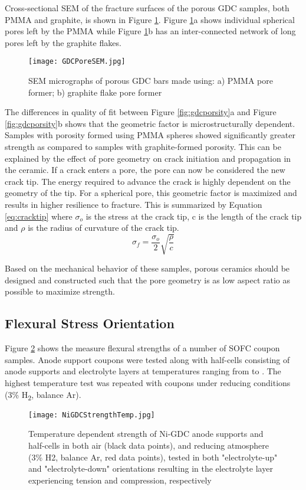 Cross-sectional SEM of the fracture surfaces of the porous GDC samples,
both PMMA and graphite, is shown in Figure \ref{fig:GDCPoreSEM}.
Figure \ref{fig:GDCPoreSEM}a shows individual spherical pores left by the PMMA while Figure \ref{fig:GDCPoreSEM}b has an inter-connected network of long pores left by the graphite flakes.
\begin{figure}
    \texttt{[image: GDCPoreSEM.jpg]}
    \caption{SEM micrographs of porous GDC bars made using: a) PMMA pore former; b) graphite flake pore former}
    \label{fig:GDCPoreSEM}
\end{figure}

The differences in quality of fit between Figure \ref{fig:gdcporsity}a and Figure \ref{fig:gdcporsity}b shows that the geometric factor is microstructurally dependent.
Samples with porosity formed using PMMA spheres showed significantly greater strength as compared to samples with graphite-formed porosity.
This can be explained by the effect of pore geometry on crack initiation and propagation in the ceramic.
If a crack enters a pore, the pore can now be considered the new crack tip.
The energy required to advance the crack is highly dependent on the geometry of the tip.
For a spherical pore, this geometric factor is maximized and results in higher resilience to fracture.
This is summarized by Equation \ref{eq:cracktip} where \(\sigma_{o}\) is the stress at the crack tip, c is the length of the crack tip and \(\rho\) is the radius of curvature of the crack tip.\cite{Carter2007}
\begin{equation}
    \sigma_{f} = \frac{\sigma_{o}}{2}\sqrt{\frac{\rho}{c}}
    \label{eq:cracktip}
\end{equation}

Based on the mechanical behavior of these samples, porous ceramics should be designed and constructed such that the pore geometry is as low aspect ratio as possible to maximize strength.

\subsection{Flexural Stress Orientation}

Figure \ref{fig:NiGDCHalfCells} shows the measure flexural strengths of a number of SOFC coupon samples.
Anode support coupons were tested along with half-cells consisting of anode supports and electrolyte layers at temperatures ranging from  to .
The highest temperature test was repeated with coupons under reducing conditions (3\% H\textsubscript{2}, balance Ar).
\begin{figure}
    \texttt{[image: NiGDCStrengthTemp.jpg]}
    \caption{Temperature dependent strength of Ni-GDC anode supports and half-cells in both air (black data points), and reducing atmosphere (3\% H2, balance Ar, red data points), tested in both "electrolyte-up" and "electrolyte-down" orientations resulting in the electrolyte layer experiencing tension and compression, respectively}
    \label{fig:NiGDCHalfCells}
\end{figure}

